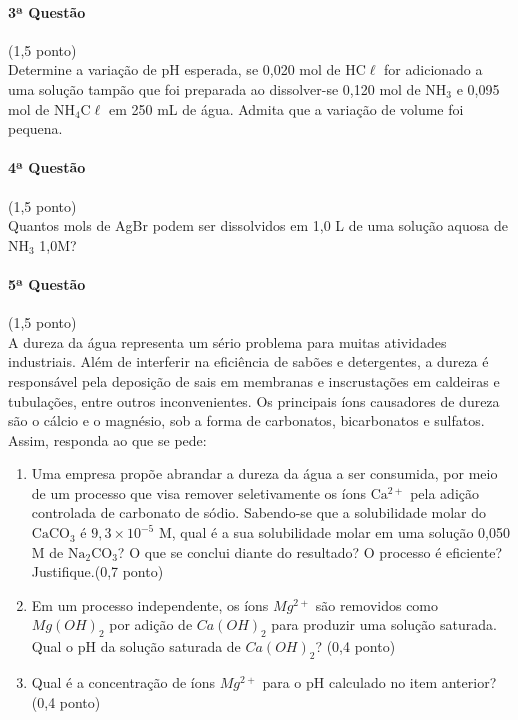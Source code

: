 \documentclass[12pt,a4paper]{article}
\begin{document}
\paragraph{3ª Questão} (1,5 ponto)\\
Determine a variação de pH esperada, se 0,020 mol de HC$\ell$ for adicionado a uma solução tampão que foi preparada ao dissolver-se 0,120 mol de $\mathrm{NH_3}$ e 0,095 mol de $\mathrm{NH_4C}\ell$ em 250 mL de água. Admita que a variação de volume foi pequena.

\paragraph{4ª Questão} (1,5 ponto)\\
Quantos mols de AgBr podem ser dissolvidos em 1,0 L de uma solução aquosa de $\mathrm{NH}_3$ 1,0M?

\paragraph{5ª Questão} (1,5 ponto)\\
A dureza da água representa um sério problema para muitas atividades industriais. Além de interferir na eficiência de sabões e detergentes, a dureza é responsável pela deposição de sais em membranas e inscrustações em caldeiras e tubulações, entre outros inconvenientes. Os principais íons causadores de dureza são o cálcio e o magnésio, sob a forma de carbonatos, bicarbonatos e sulfatos. Assim, responda ao que se pede:

\begin{enumerate}[label=(\roman*)]
\item Uma empresa propõe abrandar a dureza da água a ser consumida, por meio de um processo que visa remover seletivamente os íons $\mathrm{Ca^{2+}}$ pela adição controlada de carbonato de sódio. Sabendo-se que a solubilidade molar do $\mathrm{CaCO_3}$ é $9,3 \times 10^{-5}$ M, qual é a sua solubilidade molar em uma solução 0,050 M de $\mathrm{Na_2CO_3}$? O que se conclui diante do resultado? O processo é eficiente? Justifique.\hfill (0,7 ponto)
\item Em um processo independente, os íons $Mg^{2+}$ são removidos como $Mg(OH)_2$ por adição de $Ca(OH)_2$ para produzir uma solução saturada. Qual o pH da solução saturada de $Ca(OH)_2$? \hfill (0,4 ponto)
\item Qual é a concentração de íons $Mg^{2+}$ para o pH calculado no item anterior? \hfill (0,4 ponto)
\end{enumerate}
\end{document}

